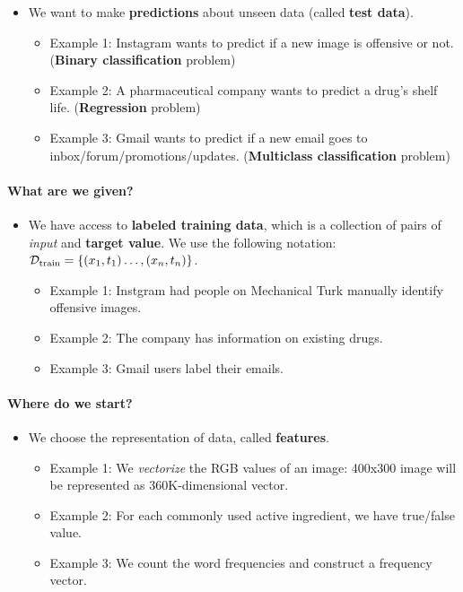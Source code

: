 \documentclass{discussion}
\providecommand{\tightlist}{%
\setlength{\itemsep}{2pt}\setlength{\parskip}{0pt}}
\begin{document}
\begin{itemize}
\tightlist
\item
  We want to make \textbf{predictions} about unseen data (called
  \textbf{test data}).

  \begin{itemize}
  \tightlist
  \item
    Example 1: Instagram wants to predict if a new image is offensive or
    not. (\textbf{Binary classification} problem)
  \item
    Example 2: A pharmaceutical company wants to predict a drug's shelf
    life. (\textbf{Regression} problem)
  \item
    Example 3: Gmail wants to predict if a new email goes to
    inbox/forum/promotions/updates. (\textbf{Multiclass classification}
    problem)
  \end{itemize}
\end{itemize}

\paragraph{What are we given?}\label{what-are-we-given}

\begin{itemize}
\tightlist
\item
  We have access to \textbf{labeled training data}, which is a
  collection of pairs of \emph{input} and \textbf{target value}. We use
  the following notation:
  \(\mathcal{D}_{\mathrm{train}} = \{(x_1, t_1) \ldots, (x_n, t_n)\}\).

  \begin{itemize}
  \tightlist
  \item
    Example 1: Instgram had people on Mechanical Turk manually identify
    offensive images.
  \item
    Example 2: The company has information on existing drugs.
  \item
    Example 3: Gmail users label their emails.
  \end{itemize}
\end{itemize}

\paragraph{Where do we start?}\label{where-do-we-start}

\begin{itemize}
\tightlist
\item
  We choose the representation of data, called \textbf{features}.

  \begin{itemize}
  \tightlist
  \item
    Example 1: We \emph{vectorize} the RGB values of an image: 400x300
    image will be represented as 360K-dimensional vector.
  \item
    Example 2: For each commonly used active ingredient, we have
    true/false value.
  \item
    Example 3: We count the word frequencies and construct a frequency
    vector.
  \end{itemize}
\end{itemize}
\end{document}
